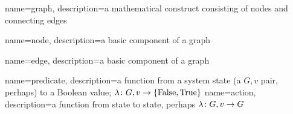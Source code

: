 
{
  name=graph,
  description={a mathematical construct consisting of nodes and connecting edges}
}

{
  name=node,
  description={a basic component of a graph}
}

{
  name=edge,
  description={a basic component of a graph}
}

{
  name=predicate,
  description={a function from a system state (a $G, v$ pair, perhaps) to a Boolean value; $\Function{G, v}{\Set{\text{False}, \text{True}}}$}
}
{
  name=action,
  description={a function from state to state, perhaps $\Function{G, v}{G}$}
}

